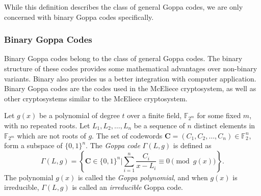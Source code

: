 While this definition describes the class of general Goppa codes, we are only concerned with binary Goppa codes specifically.


\subsubsection{Binary Goppa Codes}

Binary Goppa codes belong to the class of general Goppa codes. The binary structure of these codes provides some mathematical advantages over non-binary variants. Binary also provides us a better integration with computer application. Binary Goppa codes are the codes used in the McEliece cryptosystem, as well as other cryptosystems similar to the McEliece cryptosystem.

Let $g(x)$ be a polynomial of degree $t$ over a finite field, $\mathbb{F}_{2^m}$ for some fixed $m$, with no repeated roots. Let $L_1, L_2, \dots, L_n$ be a sequence of $n$ distinct elements in $\mathbb{F}_{2^m}$ which are not roots of $g$. The set of codewords $\mathbf{C} = (C_1, C_2, \dots, C_n) \in \mathbb{F}_2^n$, form a subspace of $\{0, 1\}^n$. The \textit{Goppa code} $\Gamma(L, g)$ is defined as
\[
    \Gamma(L, g) = \left\{\mathbf{C} \in \{0, 1\}^n \bigg| \sum_{i = 1}^n \frac{C_i}{x - L_i} \equiv 0 \pmod{g(x)}\right\}.
\]
The polynomial $g(x)$ is called the \textit{Goppa polynomial}, and when $g(x)$ is irreducible, $\Gamma(L, g)$ is called an \textit{irreducible} Goppa code.

